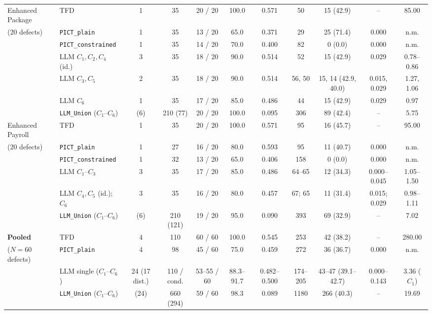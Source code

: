 \documentclass[acmsmall]{acmart}
\begin{document}
\begin{table}[t]
{\begin{tabular}{@{}ll c cc c cc cc c@{}}
    \midrule
    Enhanced Package & TFD & 1 & 35 & 20 / 20 & 100.0 & 0.571 & 50 & 15 (42.9) & -- & 85.00 \\
    (20 defects) & \texttt{PICT\_plain} & 1 & 35 & 13 / 20 & 65.0 & 0.371 & 29 & 25 (71.4) & 0.000 & n.m. \\
    & \texttt{PICT\_constrained} & 1 & 35 & 14 / 20 & 70.0 & 0.400 & 82 & 0 (0.0) & 0.000 & n.m. \\
    & LLM $C_1, C_2, C_4$ (id.) & 3 & 35 & 18 / 20 & 90.0 & 0.514 & 52 & 15 (42.9) & 0.029 & 0.78--0.86 \\
    & LLM $C_3, C_5$ & 2 & 35 & 18 / 20 & 90.0 & 0.514 & 56, 50 & 15, 14 (42.9, 40.0) & 0.015, 0.029 & 1.27, 1.06 \\
    & LLM $C_6$ & 1 & 35 & 17 / 20 & 85.0 & 0.486 & 44 & 15 (42.9) & 0.029 & 0.97 \\
    & \texttt{LLM\_Union} ($C_1$--$C_6$) & (6) & 210 (77) & 20 / 20 & 100.0 & 0.095 & 306 & 89 (42.4) & -- & 5.75 \\
    \midrule
    Enhanced Payroll & TFD & 1 & 35 & 20 / 20 & 100.0 & 0.571 & 95 & 16 (45.7) & -- & 95.00 \\
    (20 defects) & \texttt{PICT\_plain} & 1 & 27 & 16 / 20 & 80.0 & 0.593 & 95 & 11 (40.7) & 0.000 & n.m. \\
    & \texttt{PICT\_constrained} & 1 & 32 & 13 / 20 & 65.0 & 0.406 & 158 & 0 (0.0) & 0.000 & n.m. \\
    & LLM $C_1$--$C_3$ & 3 & 35 & 17 / 20 & 85.0 & 0.486 & 64--65 & 12 (34.3) & 0.000--0.045 & 1.05--1.50 \\
    & LLM $C_4, C_5$ (id.); $C_6$ & 3 & 35 & 16 / 20 & 80.0 & 0.457 & 67; 65 & 11 (31.4) & 0.015; 0.029 & 0.98--1.11 \\
    & \texttt{LLM\_Union} ($C_1$--$C_6$) & (6) & 210 (121) & 19 / 20 & 95.0 & 0.090 & 393 & 69 (32.9) & -- & 7.02 \\
    \midrule
    \textbf{Pooled} & TFD & 4 & 110 & 60 / 60 & 100.0 & 0.545 & 253 & 42 (38.2) & -- & 280.00 \\
    ($N=60$ defects) & \texttt{PICT\_plain} & 4 & 98 & 45 / 60 & 75.0 & 0.459 & 272 & 36 (36.7) & 0.000 & n.m. \\
    & LLM single ($C_1$--$C_6$) & 24 (17 dist.) & 110 / cond. & 53--55 / 60 & 88.3--91.7 & 0.482--0.500 & 174--205 & 43--47 (39.1--42.7) & 0.000--0.143 & 3.36 ($C_1$) \\
    & \texttt{LLM\_Union} ($C_1$--$C_6$) & (24) & 660 (294) & 59 / 60 & 98.3 & 0.089 & 1180 & 266 (40.3) & -- & 19.69 \\

\end{tabular}}
\end{table}
\end{document}
